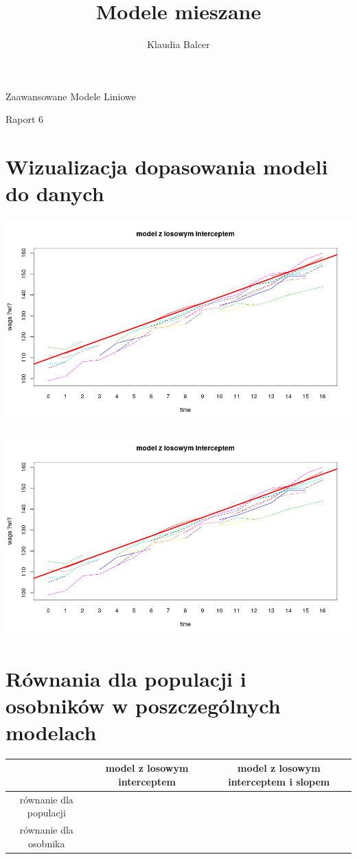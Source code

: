 \documentclass[a4paper,11pt]{article}
\author{Klaudia Balcer}
\title{Modele mieszane}
\begin{document}
\maketitle
\begin{center}
Zaawansowane Modele Liniowe

Raport 6
\end{center} 

\pagebreak

\section{Wizualizacja dopasowania modeli do danych}


\includegraphics[scale=.67]{Int.png} 


\includegraphics[scale=.67]{IntS.png} 

\pagebreak

\section{Równania dla populacji i osobników w poszczególnych modelach}

\begin{tabular}{|c|c|c|} \hline
  & model z losowym interceptem & model z losowym interceptem i slopem \\ \hline
równanie dla populacji & & \\ \hline
równanie dla osobnika & & \\ \hline

\end{tabular}
\end{document}
